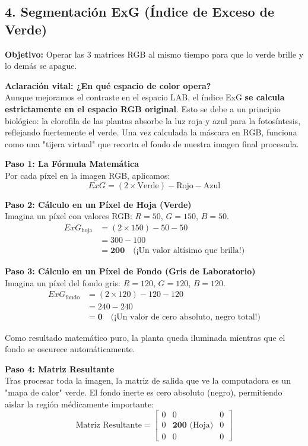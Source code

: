 \documentclass[11pt,a4paper]{article}
\begin{document}
\subsection{4. Segmentación ExG (Índice de Exceso de Verde)}
\textbf{Objetivo:} Operar las 3 matrices RGB al mismo tiempo para que lo verde brille y lo demás se apague.

\textbf{Aclaración vital: ¿En qué espacio de color opera?} \\
Aunque mejoramos el contraste en el espacio LAB, el índice ExG \textbf{se calcula estrictamente en el espacio RGB original}. Esto se debe a un principio biológico: la clorofila de las plantas absorbe la luz roja y azul para la fotosíntesis, reflejando fuertemente el verde. Una vez calculada la máscara en RGB, funciona como una "tijera virtual" que recorta el fondo de nuestra imagen final procesada.

\textbf{Paso 1: La Fórmula Matemática} \\
Por cada píxel en la imagen RGB, aplicamos:
$$ ExG = (2 \times \text{Verde}) - \text{Rojo} - \text{Azul} $$

\textbf{Paso 2: Cálculo en un Píxel de Hoja (Verde)} \\
Imagina un píxel con valores RGB: $R=50$, $G=150$, $B=50$.
\begin{align*}
ExG_{\text{hoja}} &= (2 \times 150) - 50 - 50 \\
&= 300 - 100 \\
&= \mathbf{200} \quad \text{(¡Un valor altísimo que brilla!)}
\end{align*}

\textbf{Paso 3: Cálculo en un Píxel de Fondo (Gris de Laboratorio)} \\
Imagina un píxel del fondo gris: $R=120$, $G=120$, $B=120$.
\begin{align*}
ExG_{\text{fondo}} &= (2 \times 120) - 120 - 120 \\
&= 240 - 240 \\
&= \mathbf{0} \quad \text{(¡Un valor de cero absoluto, negro total!)}
\end{align*}

Como resultado matemático puro, la planta queda iluminada mientras que el fondo se oscurece automáticamente.

\textbf{Paso 4: Matriz Resultante} \\
Tras procesar toda la imagen, la matriz de salida que ve la computadora es un "mapa de calor" verde. El fondo inerte es cero absoluto (negro), permitiendo aislar la región médicamente importante:
$$
\text{Matriz Resultante} = \begin{bmatrix}
0 & 0 & 0 \\
0 & \mathbf{200} \text{ (Hoja)} & 0 \\
0 & 0 & 0
\end{bmatrix}
$$
\end{document}
